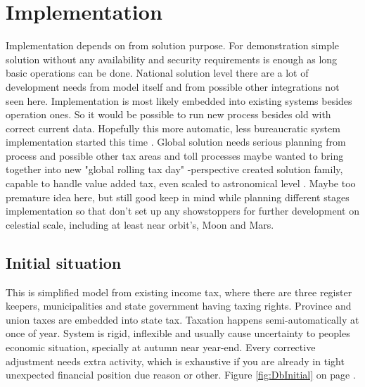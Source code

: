 %
%
%
\chapter{Implementation}
\label{implementation}

Implementation depends on from solution purpose.
For demonstration simple solution without any availability
and security requirements is enough as long basic operations can be done.
National solution level there are a lot of development needs from model itself
and from possible other integrations not seen here.
Implementation is most likely embedded into existing systems besides operation ones.
So it would be possible to run new process besides old with correct current data.
Hopefully this more automatic,
less bureaucratic system implementation started this time \cite{BasicIncomeInit}.
Global solution needs serious planning from process and possible other tax areas
and toll processes maybe wanted to bring together into new
"global rolling tax day" -perspective created solution family,
capable to handle value added tax, even scaled to astronomical level \cite{LTEonMoon}.
Maybe too premature idea here,
but still good keep in mind while planning different stages implementation
so that don't set up any showstoppers for further development on celestial scale,
including at least near orbit's, Moon and Mars.

\section{Initial situation}
\label{db_initial_situation}
This is simplified model from existing income tax,
where there are three register keepers,
municipalities and state government having taxing rights.
Province and union taxes are embedded into state tax.
Taxation happens semi-automatically at once of year.
System is rigid, inflexible and usually cause uncertainty to peoples economic situation,
specially at autumn near year-end.
Every corrective adjustment needs extra activity,
which is exhaustive if you are already in tight unexpected financial position due reason or other.
Figure \ref{fig:DbInitial} on page \pageref{fig:DbInitial}.

